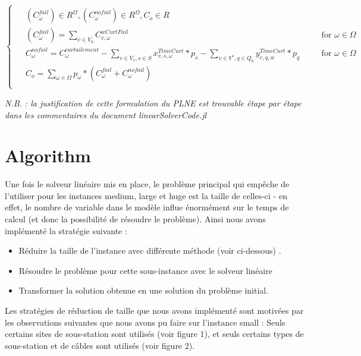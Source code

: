 \documentclass[a4paper,12pt]{article}
\begin{document}
    \begin{equation}
        \begin{cases}
            \begin{alignedat}{2}
                & (C_{\omega}^{fail}) \in R^{\Omega}, (C_{\omega}^{nofail}) \in R^{\Omega}, C_{o} \in R\\
                & (C_{\omega}^{fail}) = \sum_{v \in V_{0}} C_{v,\omega}^{wCurtFail} &&\quad \text{for } \omega \in \Omega \\
                & C_{\omega}^{nofail} = C_\omega^{curtailement} - \sum_{v \in V_{s},s \in S} x_{v,s,\omega}^{TimeCurt}*p_s - \sum_{v \in V^s, q \in Q_{0}} y_{e,q,w}^{TimeCurt}*p_{q} && \quad \text{for } \omega \in \Omega \\
                & C_{o} = \sum_{\omega \in \Omega} p_{\omega} * (C_{\omega}^{fail} + C_{\omega}^{nofail}) \\
            \end{alignedat}
        \end{cases}
    \end{equation}

    \textit{N.B. : la justification de cette formulation du PLNE est trouvable étape par étape dans les commentaires du document linearSolverCode.jl}



\section {Algorithm}
Une fois le solveur linéaire mis en place, le problème principal qui empêche de l'utiliser pour les instances medium, large et huge est la taille de celles-ci - en effet, le nombre de variable dans le modèle influe énormément sur le temps de calcul (et donc la possibilité de résoudre le problème). 
Ainsi nous avons implémenté la stratégie suivante :
\begin{itemize}
    \item Réduire la taille de l'instance avec différente méthode (voir ci-dessous) .
    \item Résoudre le problème pour cette sous-instance avec le solveur linéaire
    \item Transformer la solution obtenue en une solution du problème initial.
\end{itemize}
Les stratégies de réduction de taille que nous avons implémenté sont motivées par les observations suivantes que nous avons pu faire sur l'instance small :
Seuls certains sites de sous-station sont utilisés (voir figure 1), et seuls certains types de sous-station et de câbles sont utilisés (voir figure 2).
\end{document}
